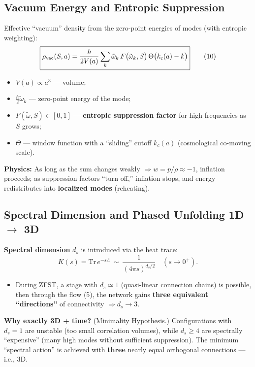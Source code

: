 \documentclass[12pt,a4paper]{article}
\begin{document}
\subsection{Vacuum Energy and Entropic Suppression}
Effective ``vacuum'' density from the zero-point energies of modes (with entropic weighting):
\[
\boxed{\rho_{\rm vac}(S,a) = \frac{\hbar}{2 V(a)} \sum_k \tilde{\omega}_k \, F \big( \tilde{\omega}_k, S \big) \, \Theta \big( k_c(a) - k \big)} \tag{10}
\]
\begin{itemize}
    \item \(V(a) \propto a^3\) — volume;
    \item \(\frac{\hbar}{2} \tilde{\omega}_k\) — zero-point energy of the mode;
    \item \(F(\tilde{\omega},S) \in [0,1]\) — \textbf{entropic suppression factor} for high frequencies as \(S\) grows;
    \item \(\Theta\) — window function with a ``sliding'' cutoff \(k_c(a)\) (cosmological co-moving scale).
\end{itemize}

\textbf{Physics:} As long as the sum changes weakly \(\Rightarrow w = p/\rho \approx -1\), inflation proceeds; as suppression factors ``turn off,'' inflation stops, and energy redistributes into \textbf{localized modes} (reheating).

\subsection{Spectral Dimension and Phased Unfolding 1D \(\to\) 3D}
\textbf{Spectral dimension} \(d_s\) is introduced via the heat trace:
\[
K(s) = \mathrm{Tr} \, e^{-s \Lambda} \ \sim \ \frac{1}{(4\pi s)^{d_s/2}} \quad (s \to 0^+). \tag{11}
\]
\begin{itemize}
    \item During ZFST, a stage with \(d_s \simeq 1\) (quasi-linear connection chains) is possible, then through the flow (5), the network gains \textbf{three equivalent ``directions''} of connectivity \(\Rightarrow d_s \to 3\).
\end{itemize}

\textbf{Why exactly 3D + time?}  
(Minimality Hypothesis.) Configurations with \(d_s = 1\) are unstable (too small correlation volumes), while \(d_s \ge 4\) are spectrally ``expensive'' (many high modes without sufficient suppression). The minimum ``spectral action'' is achieved with \textbf{three} nearly equal orthogonal connections — i.e., 3D.
\end{document}
